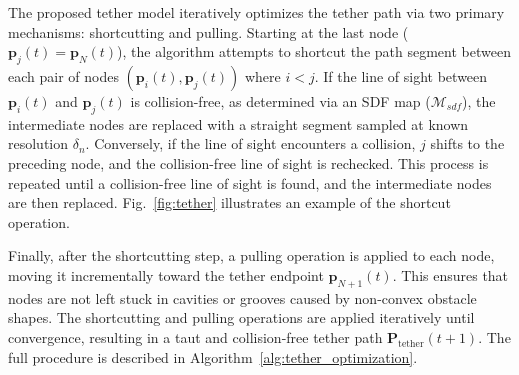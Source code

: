 The proposed tether model iteratively optimizes the tether path via two primary mechanisms: shortcutting and pulling. %
Starting at the last node ($\mathbf{p}_j(t) = \mathbf{p}_{N}(t)$), the algorithm attempts to shortcut the path segment between each pair of nodes \( (\mathbf{p}_i(t), \mathbf{p}_j(t)) \) where \( i < j \).
If the line of sight between \( \mathbf{p}_i(t) \) and \( \mathbf{p}_j(t) \) is collision-free, as determined via an \ac{SDF} map (\( \mathcal{M}_{sdf} \)), the intermediate nodes are replaced with a straight segment sampled at known resolution \( \delta_n \). Conversely, if the line of sight encounters a collision, $j$ shifts to the preceding node, and the collision-free line of sight is rechecked. This process is repeated until a collision-free line of sight is found, and the intermediate nodes are then replaced. Fig.~\ref{fig:tether} illustrates an example of the shortcut operation. 

Finally, after the shortcutting step, a pulling operation is applied to each node, moving it incrementally toward the tether endpoint \( \mathbf{p}_{N+1}(t) \). This ensures that nodes are not left stuck in cavities or grooves caused by non-convex obstacle shapes. The shortcutting and pulling operations are applied iteratively until convergence, resulting in a taut and collision-free tether path \( \mathbf{P}_{\mathrm{tether}}(t+1) \). The full procedure is described in Algorithm~\ref{alg:tether_optimization}.









